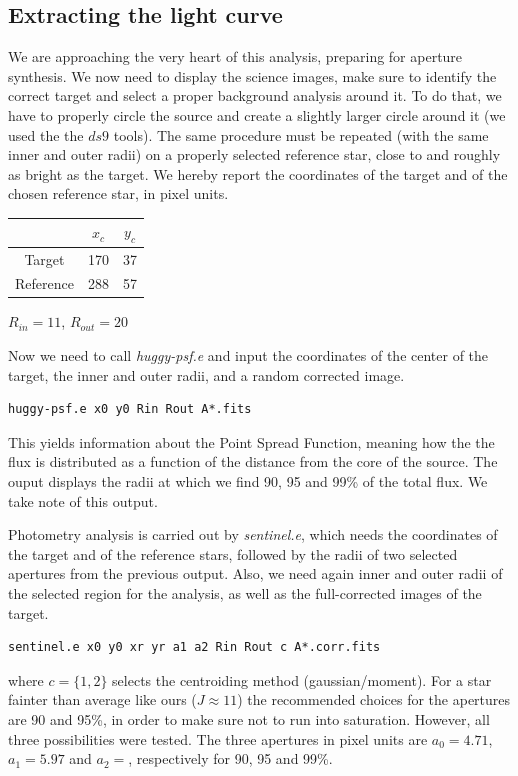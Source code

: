 \documentclass[a4paper,11pt,twocolumn]{article}
\begin{document}
\subsection{Extracting the light curve}
We are approaching the very heart of this analysis, preparing for 
aperture synthesis. We now need to display the science images, make 
sure to identify the correct target and select a proper background 
analysis around it. To do that, we have to properly circle the source 
and create a slightly larger circle around it (we used the the $ds9$ tools).
The same procedure must be repeated (with the same inner and outer radii) 
on a properly selected reference star, close to and roughly as bright 
as the target. We hereby report the coordinates of the target and of the 
chosen reference star, in pixel units.
\begin{center}
    \begin{tabular}{|c|c|c|}
    \hline
     & $x_c$ & $y_c$ \\
    \hline
    Target    &  170  &  37    \\
    Reference & 288 & 57  \\
    \hline
    \end{tabular}

    \medskip

    $R_{in} = 11$, $R_{out} = 20$
\end{center}
Now we need to call \textit{huggy-psf.e} and input the coordinates of the 
center of the target, the inner and outer radii, and a random corrected 
image.
\begin{lstlisting}
huggy-psf.e x0 y0 Rin Rout A*.fits
\end{lstlisting}
This yields information about the Point Spread Function, meaning how the 
the flux is distributed as a function of the distance from the core of 
the source. The ouput displays the radii at which we find 90, 95 and 99\%
of the total flux. We take note of this output. 

Photometry analysis is carried out by \textit{sentinel.e}, which needs 
the coordinates of the target and of the reference stars, followed by 
the radii of two selected apertures from the previous output. Also, we need 
again inner and outer radii of the selected region for the analysis, as well 
as the full-corrected images of the target. 
\begin{lstlisting}
sentinel.e x0 y0 xr yr a1 a2 Rin Rout c A*.corr.fits
\end{lstlisting}
where $c=\{1,2\}$ selects the centroiding method (gaussian/moment). For a star
fainter than average like ours ($J\approx 11$) the recommended choices for 
the apertures are 90 and 95\%, in order to make sure not to run into 
saturation. However, all three possibilities were tested. The three apertures 
in pixel units are $a_0=4.71$, $a_1=5.97$ and $a_2=$, respectively for 90,
95 and 99\%.
\end{document}
